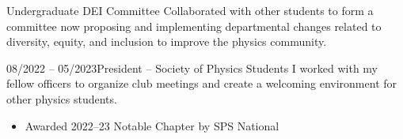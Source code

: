 \documentclass{cv}
\begin{document}
\begin{extracurricular}{}{Undergraduate DEI Committee}
    Collaborated with other students to form a committee now proposing and
    implementing departmental changes related to diversity, equity, and
    inclusion to improve the physics community.
\end{extracurricular}

\begin{extracurricular}{08/2022 -- 05/2023}{President -- Society of Physics Students}
    I worked with my fellow officers to organize club meetings and create a
    welcoming environment for other physics students.
    \vspace{-0.03in}
    \begin{itemize}[leftmargin=15pt]
        \item Awarded 2022--23 Notable Chapter by SPS National
    \end{itemize}
\end{extracurricular}
\end{document}
